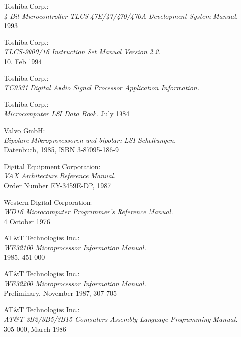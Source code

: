  Toshiba Corp.: \\
                 {\em 4-Bit Microcontroller TLCS-47E/47/470/470A Development
                  System Manual.\/} \\
                 1993

 Toshiba Corp.: \\
                   {\em TLCS-9000/16 Instruction Set Manual Version
                   2.2.\/} \\
                   10. Feb 1994

 Toshiba Corp.: \\
                   {\em TC9331 Digital Audio Signal Processor
                   Application Information.}

 Toshiba Corp.: \\
                   {\em Microcomputer LSI Data Book.}
                   July 1984

 Valvo GmbH: \\
                {\em Bipolare Mikroprozessoren und bipolare
                LSI-Schaltungen.\/} \\
                Datenbuch, 1985, ISBN 3-87095-186-9

 Digital Equipment Corporation: \\
            {\em VAX Architecture Reference Manual.\/} \\
            Order Number EY-3459E-DP, 1987

 Western Digital Corporation: \\
            {\em WD16 Microcomputer Programmer's Reference Manual.\/} \\
            4 October 1976

 AT\&T Technologies Inc.: \\
            {\em WE32100 Microprocessor Information Manual.\/} \\
            1985, 451-000

 AT\&T Technologies Inc.: \\
            {\em WE32200 Microprocessor Information Manual.\/} \\
            Preliminary, November 1987, 307-705

 AT\&T Technologies Inc.: \\
            {\em AT\&T 3B2/3B5/3B15 Computers Assembly Language Programming Manual.\/} \\
            305-000, March 1986

